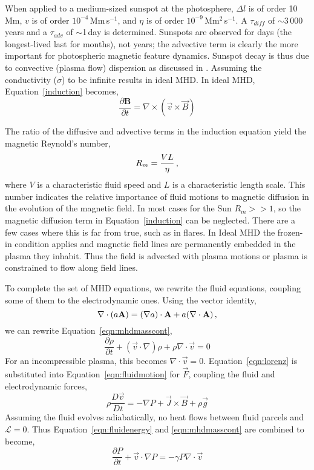 When applied to a medium-sized sunspot at the photosphere, $\Delta l$ is of order 10\,Mm, $v$ is of order $10^{-4}$\,Mm\,s$^{-1}$, and $\eta$ is of order $10^{-9}$\,Mm$^2$\,s$^{-1}$. A $\tau_{diff}$ of $\sim$3\,000\,years and a $\tau_{adv}$ of $\sim$1\,day is determined. Sunspots are observed for days (the longest-lived last for months), not years; the advective term is clearly the more important for photospheric magnetic feature dynamics. Sunspot decay is thus due to convective (plasma flow) dispersion as discussed in \cite{Schrijver:2001}. Assuming the conductivity ($\sigma$) to be infinite results in ideal \gls{MHD}. In ideal MHD, Equation~\ref{induction} becomes,
\begin{equation}\label{idealind}
\frac{\partial \mathbf{B}}{\partial t} = \nabla \times (\vec{v} \times \vec{B})  
\end{equation}

The ratio of the diffusive and advective terms in the induction equation yield the magnetic Reynold's number,
\begin{equation}\label{eqn:reynum}
R_m = \frac{V L}{\eta} \mbox{\,,}
\end{equation}
where $V$ is a characteristic fluid speed and $L$ is a characteristic length scale.
This number indicates the relative importance of fluid motions to magnetic diffusion in the evolution of the magnetic field. In most cases for the Sun $R_m >> 1$, so the magnetic diffusion term in Equation~\ref{induction} can be neglected. There are a few cases where this is far from true, such as in flares. In Ideal \gls{MHD} the frozen-in condition applies and magnetic field lines are permanently embedded in the plasma they inhabit. Thus the field is advected with plasma motions or plasma is constrained to flow along field lines.

To complete the set of MHD equations, we rewrite the fluid equations, coupling some of them to the electrodynamic ones. Using the vector identity, 
\begin{equation}
\nabla\cdot(a\vec{A})=(\nabla a)\cdot \vec{A}+a(\nabla\cdot\vec{A}) \mbox{\,,} 
\end{equation}
we can rewrite Equation~\ref{eqn:mhdmasscont},
\begin{equation} 
\frac{\partial\rho}{\partial t}+(\vec{v}\cdot\nabla)\rho+\rho\nabla\cdot\vec{v} = 0  
\end{equation}
For an incompressible plasma, this becomes $\nabla\cdot\vec{v}=0$. Equation~\ref{eqn:lorenz} is substituted into Equation~\ref{eqn:fluidmotion} for $\vec{F}$, coupling the fluid and electrodynamic forces, 
\begin{equation}\label{eqn:mhdforce}
\rho\frac{D \vec{v}}{D t}=-\nabla P + \vec{J} \times \vec{B} + \rho \vec{g}  
\end{equation}
Assuming the fluid evolves adiabatically, no heat flows between fluid parcels and $\mathcal{L}=0$. Thus Equation~\ref{eqn:fluidenergy} and \ref{eqn:mhdmasscont} are combined to become,
\begin{equation}
\frac{\partial P}{\partial t}+\vec{v}\cdot\nabla P = -\gamma P \nabla \cdot \vec{v}  
\end{equation}

